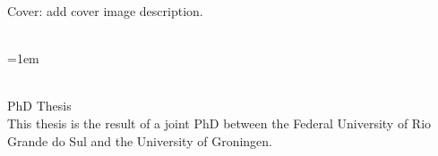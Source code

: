\thispagestyle{empty}

\hyphenation{}

\null
\vfill

\noindent Cover: add cover image description.
\vspace{1.5cm}

\noindent\myTitle\\
\hangindent=1em \mySubtitle

\noindent \myName\\
PhD Thesis\\

\vspace{1.5cm}
\noindent This thesis is the result of a joint PhD between the Federal University of Rio Grande do Sul and the University of Groningen. \\

\vspace{1.5cm}


